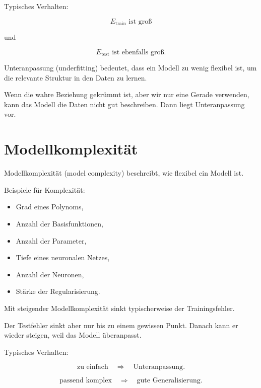 Typisches Verhalten:

\[
    E_{\mathrm{train}}
    \text{ ist groß}
\]

und

\[
    E_{\mathrm{test}}
    \text{ ist ebenfalls groß}.
\]

\begin{definitionbox}
Unteranpassung (underfitting) bedeutet, dass ein Modell zu wenig flexibel ist, um die relevante Struktur in den Daten zu lernen.
\end{definitionbox}

\begin{examplebox}
Wenn die wahre Beziehung gekrümmt ist, aber wir nur eine Gerade verwenden, kann das Modell die Daten nicht gut beschreiben.
Dann liegt Unteranpassung vor.
\end{examplebox}

\section{Modellkomplexität}

Modellkomplexität (model complexity) beschreibt, wie flexibel ein Modell ist.

Beispiele für Komplexität:

\begin{itemize}
    \item Grad eines Polynoms,
    \item Anzahl der Basisfunktionen,
    \item Anzahl der Parameter,
    \item Tiefe eines neuronalen Netzes,
    \item Anzahl der Neuronen,
    \item Stärke der Regularisierung.
\end{itemize}

\begin{conceptbox}
Mit steigender Modellkomplexität sinkt typischerweise der Trainingsfehler.

Der Testfehler sinkt aber nur bis zu einem gewissen Punkt.
Danach kann er wieder steigen, weil das Modell überanpasst.
\end{conceptbox}

Typisches Verhalten:

\[
    \text{zu einfach}
    \quad
    \Rightarrow
    \quad
    \text{Unteranpassung}.
\]

\[
    \text{passend komplex}
    \quad
    \Rightarrow
    \quad
    \text{gute Generalisierung}.
\]

